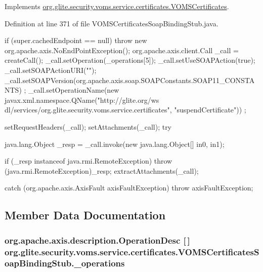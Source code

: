 Implements \hyperlink{interfaceorg_1_1glite_1_1security_1_1voms_1_1service_1_1certificates_1_1VOMSCertificates_ab66e25381a49f5f2210fe7ab4fa9a964}{org.glite.security.voms.service.certificates.VOMSCertificates}.



Definition at line 371 of file VOMSCertificatesSoapBindingStub.java.


\begin{DoxyCode}
                                                                                 
                                                                                {
        if (super.cachedEndpoint == null) {
            throw new org.apache.axis.NoEndPointException();
        }
        org.apache.axis.client.Call _call = createCall();
        _call.setOperation(_operations[5]);
        _call.setUseSOAPAction(true);
        _call.setSOAPActionURI("");
        _call.setSOAPVersion(org.apache.axis.soap.SOAPConstants.SOAP11_CONSTANTS)
      ;
        _call.setOperationName(new javax.xml.namespace.QName("http://glite.org/ws
      dl/services/org.glite.security.voms.service.certificates", "suspendCertificate"))
      ;

        setRequestHeaders(_call);
        setAttachments(_call);
 try {        java.lang.Object _resp = _call.invoke(new java.lang.Object[] {in0, 
      in1});

        if (_resp instanceof java.rmi.RemoteException) {
            throw (java.rmi.RemoteException)_resp;
        }
        extractAttachments(_call);
  } catch (org.apache.axis.AxisFault axisFaultException) {
  throw axisFaultException;
}
    }
\end{DoxyCode}


\subsection{Member Data Documentation}
\hypertarget{classorg_1_1glite_1_1security_1_1voms_1_1service_1_1certificates_1_1VOMSCertificatesSoapBindingStub_ab3111b5cf47855fe95aa496610062dbe}{
\subsubsection[{\_\-operations}]{\setlength{\rightskip}{0pt plus 5cm}org.apache.axis.description.OperationDesc \mbox{[}$\,$\mbox{]} {\bf org.glite.security.voms.service.certificates.VOMSCertificatesSoapBindingStub.\_\-operations}}}
\label{classorg_1_1glite_1_1security_1_1voms_1_1service_1_1certificates_1_1VOMSCertificatesSoapBindingStub_ab3111b5cf47855fe95aa496610062dbe}


